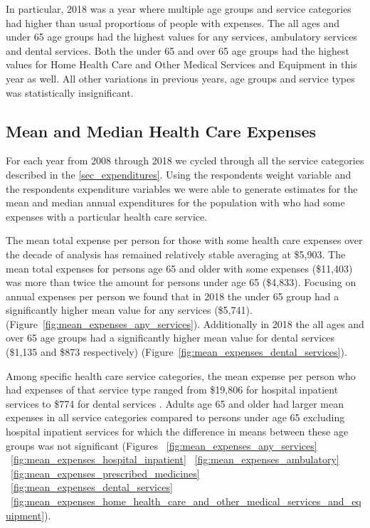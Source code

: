 \documentclass{ucetd}
\begin{document}
In particular, 2018 was a year where multiple age groups and service categories had higher than usual proportions of people with expenses. The all ages and under 65 age groups had the highest values for any services, ambulatory services and dental services. Both the under 65 and over 65 age groups had the highest values for Home Health Care and Other Medical Services and Equipment in this year as well. All other variations in previous years, age groups and service types was statistically insignificant.

\subsection{ Mean and Median Health Care Expenses}
For each year from 2008 through 2018 we cycled through all the service categories described in the \ref{sec_expenditures}. Using the respondents weight variable and the respondents expenditure variables we were able to generate estimates for the mean and median annual expenditures for the population with who had some expenses with a particular health care service. 

The mean total expense per person for those with some health care expenses over the decade of analysis has remained relatively stable averaging at \$5,903. The mean total expenses for persons age 65 and older with some expenses (\$11,403) was more than twice the amount for persons under age 65 (\$4,833). Focusing on annual expenses per person we found that in 2018 the under 65 group had a significantly higher mean value for any services (\$5,741). (Figure~\ref{fig:mean_expenses_any_services}). Additionally in 2018 the all ages and over 65 age groups had a significantly higher mean value for dental services (\$1,135 and \$873 respectively) (Figure~\ref{fig:mean_expenses_dental_services}).  

Among specific health care service categories, the mean expense per person who had expenses of that service type ranged from \$19,806 for hospital inpatient services to \$774 for dental services . Adults age 65 and older had larger mean expenses in all service categories compared to persons under age 65 excluding hospital inpatient services for which the difference in means between these age groups was not significant (Figures ~\ref{fig:mean_expenses_any_services} ~\ref{fig:mean_expenses_hospital_inpatient} ~\ref{fig:mean_expenses_ambulatory} ~\ref{fig:mean_expenses_prescribed_medicines} ~\ref{fig:mean_expenses_dental_services} ~\ref{fig:mean_expenses_home_health_care_and_other_medical_services_and_equipment}). 
\end{document}
